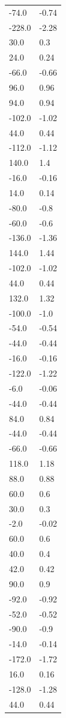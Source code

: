 \begin{longtable}{ll}
-74.0 & -0.74 \\
-228.0 & -2.28 \\
30.0 & 0.3 \\
24.0 & 0.24 \\
-66.0 & -0.66 \\
96.0 & 0.96 \\
94.0 & 0.94 \\
-102.0 & -1.02 \\
44.0 & 0.44 \\
-112.0 & -1.12 \\
140.0 & 1.4 \\
-16.0 & -0.16 \\
14.0 & 0.14 \\
-80.0 & -0.8 \\
-60.0 & -0.6 \\
-136.0 & -1.36 \\
144.0 & 1.44 \\
-102.0 & -1.02 \\
44.0 & 0.44 \\
132.0 & 1.32 \\
-100.0 & -1.0 \\
-54.0 & -0.54 \\
-44.0 & -0.44 \\
-16.0 & -0.16 \\
-122.0 & -1.22 \\
-6.0 & -0.06 \\
-44.0 & -0.44 \\
84.0 & 0.84 \\
-44.0 & -0.44 \\
-66.0 & -0.66 \\
118.0 & 1.18 \\
88.0 & 0.88 \\
60.0 & 0.6 \\
30.0 & 0.3 \\
-2.0 & -0.02 \\
60.0 & 0.6 \\
40.0 & 0.4 \\
42.0 & 0.42 \\
90.0 & 0.9 \\
-92.0 & -0.92 \\
-52.0 & -0.52 \\
-90.0 & -0.9 \\
-14.0 & -0.14 \\
-172.0 & -1.72 \\
16.0 & 0.16 \\
-128.0 & -1.28 \\
44.0 & 0.44 \\

\end{longtable}
